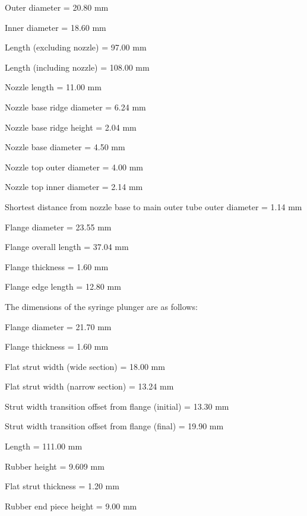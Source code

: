 \begin{compactitem}
	\item Outer diameter = 20.80 mm
	\item Inner diameter = 18.60 mm
	\item Length (excluding nozzle) = 97.00 mm
	\item Length (including nozzle) = 108.00 mm
	\item Nozzle length = 11.00 mm
	\item Nozzle base ridge diameter = 6.24 mm
	\item Nozzle base ridge height = 2.04 mm
	\item Nozzle base diameter = 4.50 mm
	\item Nozzle top outer diameter = 4.00 mm
	\item Nozzle top inner diameter = 2.14 mm
	\item Shortest distance from nozzle base to main outer tube outer diameter = 1.14 mm
	\item Flange diameter = 23.55 mm
	\item Flange overall length = 37.04 mm
	\item Flange thickness = 1.60 mm
	\item Flange edge length = 12.80 mm
\end{compactitem}

The dimensions of the syringe plunger are as follows:

\begin{compactitem}
	\item Flange diameter = 21.70 mm
	\item Flange thickness = 1.60 mm
	\item Flat strut width (wide section) = 18.00 mm
	\item Flat strut width (narrow section) = 13.24 mm
	\item Strut width transition offset from flange (initial) = 13.30 mm
	\item Strut width transition offset from flange (final) = 19.90 mm
	\item Length = 111.00 mm
	\item Rubber height = 9.609 mm 
	\item Flat strut thickness = 1.20 mm
	\item Rubber end piece height = 9.00 mm
\end{compactitem}

